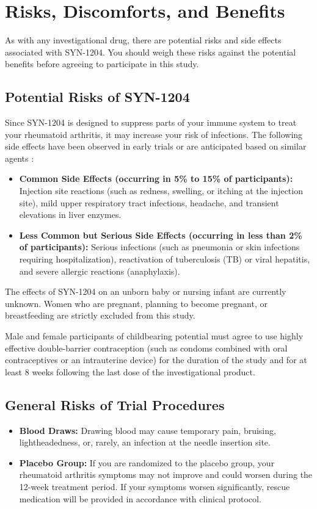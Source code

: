 \section{Risks, Discomforts, and Benefits}
As with any investigational drug, there are potential risks and side effects associated with SYN-1204. You should weigh these risks against the potential benefits before agreeing to participate in this study.

\subsection{Potential Risks of SYN-1204}
Since SYN-1204 is designed to suppress parts of your immune system to treat your rheumatoid arthritis, it may increase your risk of infections. The following side effects have been observed in early trials or are anticipated based on similar agents \cite{mciver2025safety}:

\begin{itemize}
    \item \textbf{Common Side Effects (occurring in 5\% to 15\% of participants):} Injection site reactions (such as redness, swelling, or itching at the injection site), mild upper respiratory tract infections, headache, and transient elevations in liver enzymes.
    \item \textbf{Less Common but Serious Side Effects (occurring in less than 2\% of participants):} Serious infections (such as pneumonia or skin infections requiring hospitalization), reactivation of tuberculosis (TB) or viral hepatitis, and severe allergic reactions (anaphylaxis).
\end{itemize}

\begin{tcolorbox}[warningbox, title=CRITICAL SAFETY NOTICE: Reproductive Risks]
The effects of SYN-1204 on an unborn baby or nursing infant are currently unknown. Women who are pregnant, planning to become pregnant, or breastfeeding are strictly excluded from this study. 

Male and female participants of childbearing potential must agree to use highly effective double-barrier contraception (such as condoms combined with oral contraceptives or an intrauterine device) for the duration of the study and for at least 8 weeks following the last dose of the investigational product.
\end{tcolorbox}

\subsection{General Risks of Trial Procedures}
\begin{itemize}
    \item \textbf{Blood Draws:} Drawing blood may cause temporary pain, bruising, lightheadedness, or, rarely, an infection at the needle insertion site.
    \item \textbf{Placebo Group:} If you are randomized to the placebo group, your rheumatoid arthritis symptoms may not improve and could worsen during the 12-week treatment period. If your symptoms worsen significantly, rescue medication will be provided in accordance with clinical protocol.
\end{itemize}

